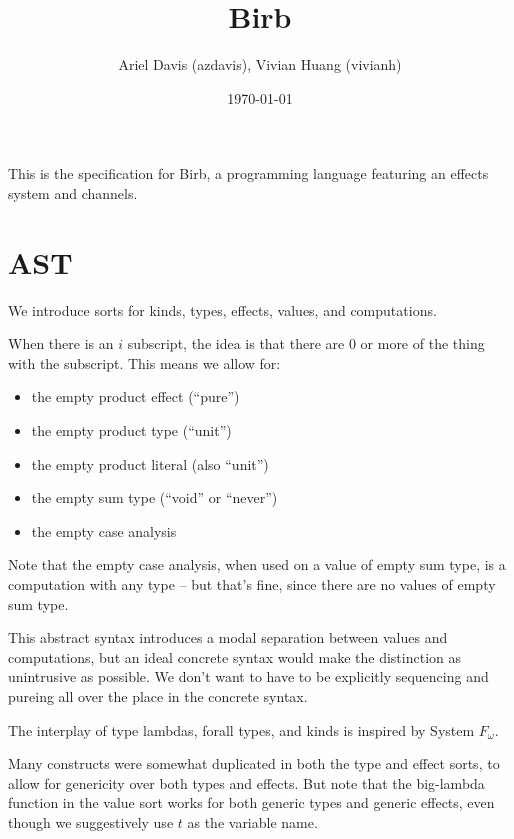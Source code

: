 \documentclass[12pt]{article}
\title{Birb}
\author{Ariel Davis (azdavis), Vivian Huang (vivianh)}
\date{\today}
\begin{document}
\maketitle

This is the specification for Birb, a programming language featuring an effects
system and channels.

\newpage
\section{AST}

We introduce sorts for kinds, types, effects, values, and computations.

When there is an $i$ subscript, the idea is that there are 0 or more of the
thing with the subscript. This means we allow for:
\begin{itemize}
\item the empty product effect (``pure'')
\item the empty product type (``unit'')
\item the empty product literal (also ``unit'')
\item the empty sum type (``void'' or ``never'')
\item the empty case analysis
\end{itemize}

Note that the empty case analysis, when used on a value of empty sum type, is a
computation with any type -- but that's fine, since there are no values of empty
sum type.

This abstract syntax introduces a modal separation between values and
computations, but an ideal concrete syntax would make the distinction as
unintrusive as possible. We don't want to have to be explicitly sequencing and
\textsf{pure}ing all over the place in the concrete syntax.

The interplay of type lambdas, forall types, and kinds is inspired by System
$F_\omega$.

Many constructs were somewhat duplicated in both the type and effect sorts, to
allow for genericity over both types and effects. But note that the big-lambda
function in the value sort works for both generic types and generic effects,
even though we suggestively use $t$ as the variable name.
\end{document}
